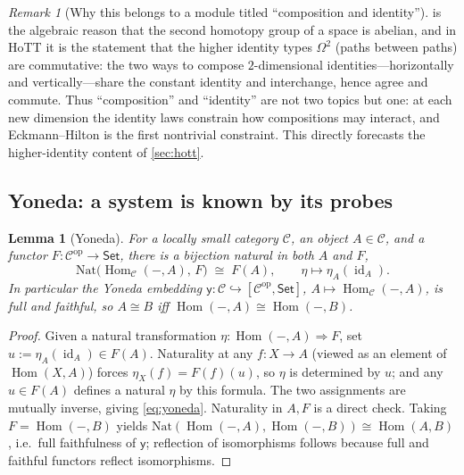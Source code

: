\documentclass[12pt]{article}
\newtheorem{lemma}[theorem]{Lemma}
\theoremstyle{definition}
\theoremstyle{remark}
\newtheorem{remark}[theorem]{Remark}
\newcommand{\Set}{\mathsf{Set}}
\newcommand{\Hom}{\operatorname{Hom}}
\newcommand{\id}{\operatorname{id}}
\newcommand{\op}{\mathrm{op}}
\newcommand{\yon}{\mathsf{y}}
\begin{document}
\begin{remark}[Why this belongs to a module titled ``composition and identity'']
\label{rem:eh}
 is the algebraic reason that the second homotopy
group of a space is abelian, and in HoTT it is the statement that the higher
identity types $\Omega^2$ (paths between paths) are commutative: the two ways to
compose $2$-dimensional identities---horizontally and vertically---share the
constant identity and interchange, hence agree and commute. Thus ``composition''
and ``identity'' are not two topics but one: at each new dimension the identity
laws constrain how compositions may interact, and Eckmann--Hilton is the first
nontrivial constraint. This directly forecasts the higher-identity content of
\cref{sec:hott}.
\end{remark}

\subsection{Yoneda: a system is known by its probes}

\begin{lemma}[Yoneda]
\label{lem:yoneda}
For a locally small category $\mathcal{C}$, an object $A\in\mathcal{C}$, and a
functor $F:\mathcal{C}^{\op}\to\Set$, there is a bijection natural in both $A$
and $F$,
\begin{equation}
\label{eq:yoneda}
\mathrm{Nat}\bigl(\Hom_{\mathcal{C}}(-,A),\,F\bigr)\;\cong\;F(A),
\qquad \eta\mapsto\eta_A(\id_A).
\end{equation}
In particular the \emph{Yoneda embedding} $\yon\!:\mathcal{C}\hookrightarrow
[\mathcal{C}^{\op},\Set]$, $A\mapsto\Hom_{\mathcal{C}}(-,A)$, is full and
faithful, so $A\cong B$ iff $\Hom(-,A)\cong\Hom(-,B)$.
\end{lemma}

\begin{proof}
Given a natural transformation $\eta:\Hom(-,A)\Rightarrow F$, set
$u:=\eta_A(\id_A)\in F(A)$. Naturality at any $f:X\to A$ (viewed as an element of
$\Hom(X,A)$) forces $\eta_X(f)=F(f)(u)$, so $\eta$ is determined by $u$; and any
$u\in F(A)$ defines a natural $\eta$ by this formula. The two assignments are
mutually inverse, giving \eqref{eq:yoneda}. Naturality in $A,F$ is a direct
check. Taking $F=\Hom(-,B)$ yields
$\mathrm{Nat}(\Hom(-,A),\Hom(-,B))\cong\Hom(A,B)$, i.e.\ full faithfulness of
$\yon$; reflection of isomorphisms follows because full and faithful functors
reflect isomorphisms.
\end{proof}
\end{document}
